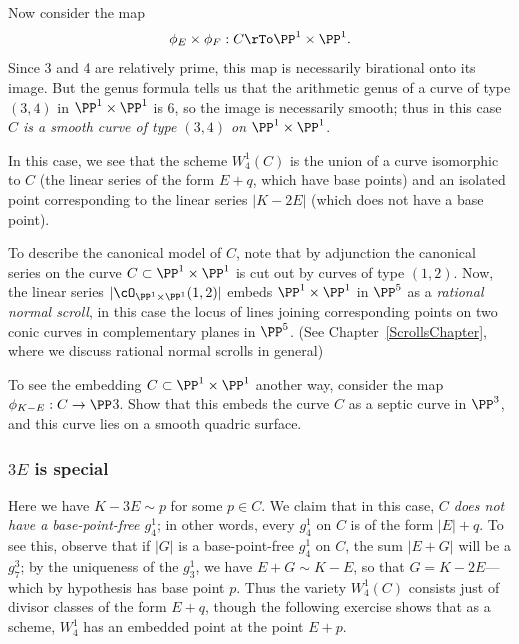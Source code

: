 Now consider the map
$$
\phi_E \times \phi_F : C \rTo \PP^1 \times \PP^1.
$$
Since 3 and 4 are relatively prime, this map is necessarily birational onto its image. But the genus formula tells us that the arithmetic genus of a curve of type $(3,4)$ in $\PP^1 \times \PP^1$ is 6, so the image is necessarily smooth; thus in this case \emph{$C$ is a smooth curve of type $(3,4)$ on $\PP^1 \times \PP^1$}.

In this case, we see that the scheme $W^1_4(C)$ is the union of a curve isomorphic to $C$ (the linear series of the form $E + q$, which have base points) and an isolated point corresponding to the linear series $|K - 2E|$ (which does not have a base point).

To describe the canonical model of $C$, note that by adjunction the canonical series on the curve $C \subset \PP^1 \times \PP^1$ is cut out by curves of type $(1,2)$. Now, the linear series $|\cO_{\PP^1 \times \PP^1}(1,2)|$ embeds $\PP^1 \times \PP^1$ in $\PP^5$ as a \emph{rational normal scroll}, in this case the locus of lines joining corresponding points on two conic curves in complementary planes in $\PP^5$. (See Chapter~\ref{ScrollsChapter}, where we discuss rational normal scrolls in general)


\begin{exercise}
To see the embedding $C \subset \PP^1 \times \PP^1$ another way, consider the map $\phi_{K-E} : C \to \PP$3. Show that this embeds the curve $C$ as a septic curve in $\PP^3$, and this curve lies on a smooth quadric surface.
\end{exercise}

\subsubsection{$3E$ is special}  Here we have $K - 3E \sim p$ for some $p \in C$. We claim that in this case, \emph{$C$ does not have a base-point-free $g^1_4$}; in other words, every $g^1_4$ on $C$ is of the form $|E| + q$. To see this, observe that if $|G|$ is a base-point-free $g^1_4$ on $C$, the sum $|E+G|$ will be a $g^3_7$; by the uniqueness of the $g^1_3$, we have $E+G \sim K - E$, so that $G = K-2E$---which by hypothesis has base point $p$. Thus the variety $W^1_4(C)$ consists just of divisor classes of the form $E+q$, though the following exercise shows that as a scheme, $W^1_4$ has an embedded point at the point $E+p$.

